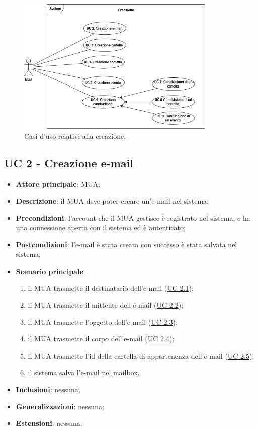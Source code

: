 

\begin{figure}[H]
    \includegraphics[width=0.85\textwidth]{sections/uc_imgs/UC-creazione.png}
    \centering
    \caption{Casi d'uso relativi alla creazione.}
\end{figure}

\subsection{UC 2 - Creazione e-mail} \label{sec:UC2}

    \begin{itemize}
        \item \textbf{Attore principale}: MUA;
        \item \textbf{Descrizione}: il MUA deve poter creare un'e-mail nel sistema;
        \item \textbf{Precondizioni}: l’account che il MUA gestisce è registrato nel sistema, e ha una connessione aperta con il sistema ed è autenticato;
        \item \textbf{Postcondizioni}: l'e-mail è stata creata con successo è stata salvata nel sistema;
        \item \textbf{Scenario principale}:
            \begin{enumerate}
                \item il MUA trasmette il destinatario dell'e-mail (\hyperref[sec:UC2.1]{UC 2.1});
                \item il MUA trasmette il mittente dell'e-mail (\hyperref[sec:UC2.2]{UC 2.2});
                \item il MUA trasmette l'oggetto dell'e-mail (\hyperref[sec:UC2.3]{UC 2.3});
                \item il MUA trasmette il corpo dell'e-mail (\hyperref[sec:UC2.4]{UC 2.4});
                \item il MUA trasmette l'id della cartella di appartenenza dell'e-mail (\hyperref[sec:UC2.5]{UC 2.5});
                \item il sistema salva l'e-mail nel mailbox.
            \end{enumerate}
        \item \textbf{Inclusioni}: nessuna;
        \item \textbf{Generalizzazioni}: nessuna;
        \item \textbf{Estensioni}: nessuna.
    \end{itemize}

